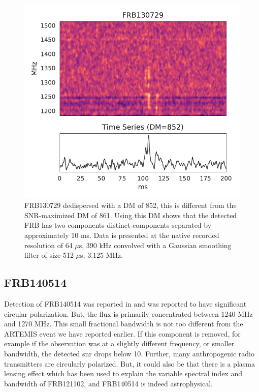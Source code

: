 \documentclass[a4paper,fleqn,usenatbib]{mnras}
\begin{document}
\begin{figure}
    \includegraphics[width=1.0\linewidth]{figures/FRB130729.pdf}
    \caption{FRB130729 dedispersed with a DM of 852, this is different from the
    SNR-maximized DM of 861. Using this DM shows that the detected FRB has two
    components distinct components separated by approximately 10 ms. Data is
    presented at the native recorded resolution of 64 $\mu$s, 390 kHz convolved
    with a Gaussian smoothing filter of size 512 $\mu$s, 3.125 MHz.
    }
    \label{fig:FRB130729}
\end{figure}

\subsection{FRB140514}

Detection of FRB140514 was reported in \citep{2015MNRAS.447..246P} and was
reported to have significant circular polarization. But, the flux is primarily
concentrated between 1240 MHz and 1270 MHz. This small fractional bandwidth is
not too different from the ARTEMIS event we have reported earlier.  If this
component is removed, for example if the observation was at a slightly different
frequency, or smaller bandwidth, the detected \gls{snr} drops below 10.
Further, many anthropogenic radio transmitters are circularly polarized. But,
it could also be that there is a plasma lensing effect
\citep{2017ApJ...842...35C} which has been used to explain the variable spectral
index and bandwidth of FRB121102, and FRB140514 is indeed astrophysical.
\end{document}
